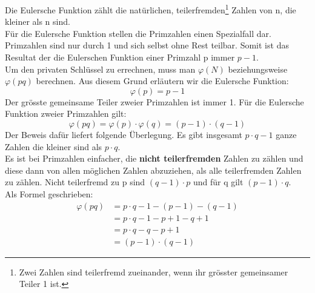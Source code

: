 Die Eulersche Funktion zählt die natürlichen, teilerfremden\footnote{Zwei Zahlen sind teilerfremd zueinander, wenn ihr grösster gemeinsamer Teiler 1 ist.}  Zahlen von n, die kleiner als n sind.\\
Für die Eulersche Funktion stellen die Primzahlen einen Spezialfall dar.
Primzahlen sind nur durch 1 und sich selbst ohne Rest teilbar. Somit ist das Resultat der die Eulerschen Funktion einer Primzahl p immer $p - 1$.\\
Um den privaten Schlüssel zu errechnen, muss man $\varphi(N)$ beziehungsweise $\varphi(pq)$ berechnen. Aus diesem Grund erläutern wir die Eulersche Funktion:
%
\begin{equation*}
  \varphi(p) = p - 1
\end{equation*}
%
Der grösste gemeinsame Teiler zweier Primzahlen ist immer 1.
Für die Eulersche Funktion zweier Primzahlen gilt:
\begin{equation}
  \varphi(pq) = \varphi(p) \cdot \varphi(q) = (p - 1) \cdot (q - 1)
  \label{eqn:eulersche_func}
\end{equation}
Der Beweis dafür liefert folgende Überlegung. Es gibt insgesamt $p \cdot q -1$ ganze Zahlen die kleiner sind als $p \cdot q$.\\
Es ist bei Primzahlen einfacher, die \textbf{nicht teilerfremden} Zahlen zu zählen und diese dann von allen möglichen Zahlen abzuziehen, als alle teilerfremden Zahlen zu zählen. Nicht teilerfremd zu p sind $(q - 1) \cdot p$ und für q gilt $ (p - 1) \cdot q$. \cite{kryptologie}\\
Als Formel geschrieben:
%
\begin{equation*}
  \begin{split}
    \varphi(pq) & = p \cdot q -1 - (p - 1) - (q - 1)  \\
     & = p \cdot q -1 - p + 1 - q + 1  \\
     & = p \cdot q -q - p + 1  \\
     & = (p -1) \cdot (q - 1)
    \label{eqn:herleitung_eulersche_func}
  \end{split}
\end{equation*}
%
